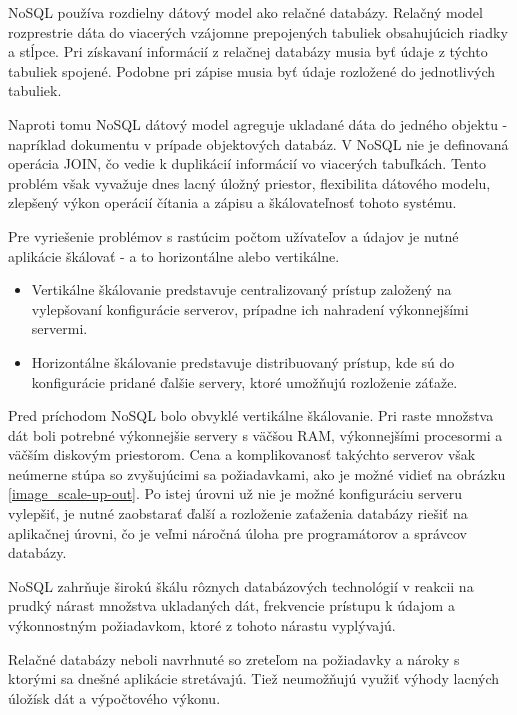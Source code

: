 	NoSQL používa rozdielny dátový model ako relačné databázy. Relačný model rozprestrie dáta do viacerých vzájomne prepojených tabuliek obsahujúcich riadky a stĺpce. Pri získavaní informácií z relačnej databázy musia byť údaje z týchto tabuliek spojené. Podobne pri zápise musia byť údaje rozložené do jednotlivých tabuliek.

	Naproti tomu NoSQL dátový model agreguje ukladané dáta do jedného objektu - napríklad dokumentu v prípade objektových databáz. V NoSQL nie je definovaná operácia JOIN, čo vedie k duplikácií informácií vo viacerých tabuľkách. Tento problém však vyvažuje dnes lacný úložný priestor, flexibilita dátového modelu, zlepšený výkon operácií čítania a zápisu a škálovateľnosť tohoto systému.
	
	
	Pre vyriešenie problémov s rastúcim počtom užívateľov a údajov je nutné aplikácie škálovať - a to horizontálne alebo vertikálne.
	\begin{itemize}
		\item Vertikálne škálovanie predstavuje centralizovaný prístup založený na vylepšovaní konfigurácie serverov, prípadne ich nahradení výkonnejšími servermi.
		\item Horizontálne škálovanie predstavuje distribuovaný prístup, kde sú do konfigurácie pridané ďalšie servery, ktoré umožňujú rozloženie záťaže.
	\end{itemize}
	Pred príchodom NoSQL bolo obvyklé vertikálne škálovanie. Pri raste množstva dát boli potrebné výkonnejšie servery s väčšou RAM, výkonnejšími procesormi a väčším diskovým priestorom. Cena a komplikovanosť takýchto serverov však neúmerne stúpa so zvyšujúcimi sa požiadavkami, ako je možné vidieť na obrázku \ref{image_scale-up-out}. Po istej úrovni už nie je možné konfiguráciu serveru vylepšiť, je nutné zaobstarať ďalší a rozloženie zaťaženia databázy riešiť na aplikačnej úrovni, čo je veľmi náročná úloha pre programátorov a správcov databázy. 
	
	
	\ac{NoSQL} zahrňuje širokú škálu rôznych databázových technológií v reakcii na prudký nárast množstva ukladaných dát, frekvencie prístupu k údajom a výkonnostným požiadavkom, ktoré z tohoto nárastu  vyplývajú.
	
	Relačné databázy neboli navrhnuté so zreteľom na požiadavky a nároky s ktorými sa dnešné aplikácie stretávajú. Tiež neumožňujú využiť výhody lacných úložísk dát a výpočtového výkonu.
	
